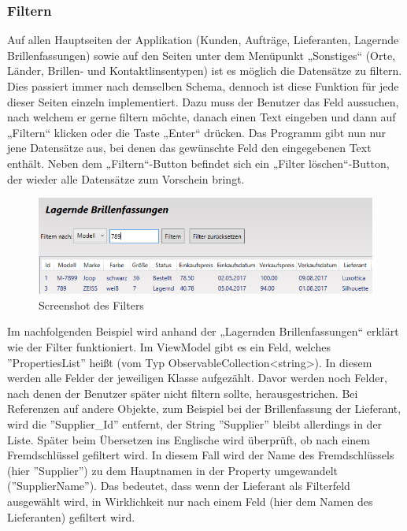 \subsubsection{Filtern}
Auf allen Hauptseiten der Applikation (Kunden, Aufträge, Lieferanten, Lagernde Brillenfassungen) sowie auf den Seiten unter dem Menüpunkt „Sonstiges“ (Orte, Länder, Brillen- und Kontaktlinsentypen) ist es möglich die Datensätze zu filtern. Dies passiert immer nach demselben Schema, dennoch ist diese Funktion für jede dieser Seiten einzeln implementiert.
Dazu muss der Benutzer das Feld aussuchen, nach welchem er gerne filtern möchte, danach einen Text eingeben und dann auf „Filtern“ klicken oder die Taste „Enter“ drücken. Das Programm gibt nun nur jene Datensätze aus, bei denen das gewünschte Feld den eingegebenen Text enthält. Neben dem „Filtern“-Button befindet sich ein „Filter löschen“-Button, der wieder alle Datensätze zum Vorschein bringt.
\begin{figure}[H]
\begin{center}
	\includegraphics[scale=0.75]{images/filter.png}
\end{center}
	\caption{Screenshot des Filters}
	\label{fig:sample}
\end{figure}
\noindent Im nachfolgenden Beispiel wird anhand der „Lagernden Brillenfassungen“ erklärt wie der Filter funktioniert. 
Im ViewModel gibt es ein Feld, welches ''PropertiesList'' heißt (vom Typ ObservableCollection\textless string\textgreater). In diesem werden alle Felder der jeweiligen Klasse aufgezählt. Davor werden noch Felder, nach denen der Benutzer später nicht filtern sollte, herausgestrichen. Bei Referenzen auf andere Objekte, zum Beispiel bei der Brillenfassung der Lieferant, wird die ''Supplier\_Id'' entfernt, der String ''Supplier'' bleibt allerdings in der Liste. Später beim Übersetzen ins Englische wird überprüft, ob nach einem Fremdschlüssel gefiltert wird. In diesem Fall wird der Name des Fremdschlüssels (hier ''Supplier'') zu dem Hauptnamen in der Property umgewandelt (''SupplierName''). Das bedeutet, dass wenn der Lieferant als Filterfeld ausgewählt wird, in Wirklichkeit nur nach einem Feld (hier dem Namen des Lieferanten) gefiltert wird.
